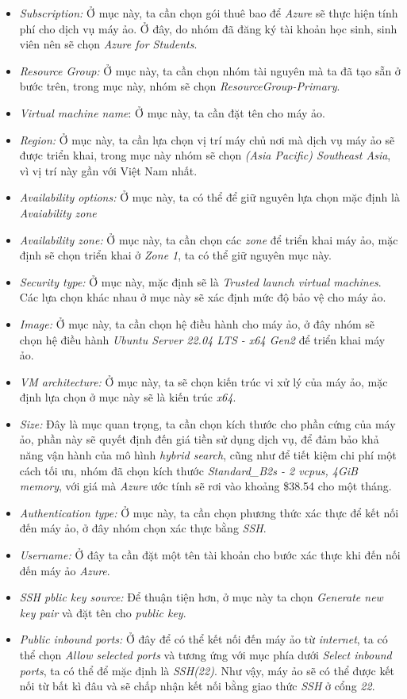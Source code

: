\begin{itemize}
    \item \textit{Subscription:} Ở mục này, ta cần chọn gói thuê bao để \textit{Azure} sẽ thực hiện tính phí cho dịch vụ máy ảo. Ở đây, do nhóm đã đăng ký tài khoản học sinh, sinh viên nên sẽ chọn \textit{Azure for Students}.
    \item \textit{Resource Group:} Ở mục này, ta cần chọn nhóm tài nguyên mà ta đã tạo sẵn ở bước trên, trong mục này, nhóm sẽ chọn \textit{ResourceGroup-Primary}.
    \item \textit{Virtual machine name}: Ở mục này, ta cần đặt tên cho máy ảo.
    \item \textit{Region:} Ở mục này, ta cần lựa chọn vị trí máy chủ nơi mà dịch vụ máy ảo sẽ được triển khai, trong mục này nhóm sẽ chọn \textit{(Asia Pacific) Southeast Asia}, vì vị trí này gần với Việt Nam nhất.
    \item \textit{Availability options:} Ở mục này, ta có thể để giữ nguyên lựa chọn mặc định là \textit{Avaiability zone}
    \item \textit{Availability zone:} Ở mục này, ta cần chọn các \textit{zone} để triển khai máy ảo, mặc định sẽ chọn triển khai ở \textit{Zone 1}, ta có thể giữ nguyên mục này.
    \item \textit{Security type:} Ở mục này, mặc định sẽ là \textit{Trusted launch virtual machines}. Các lựa chọn khác nhau ở mục này sẽ xác định mức độ bảo vệ cho máy ảo.
    \item \textit{Image:} Ở mục này, ta cần chọn hệ điều hành cho máy ảo, ở đây nhóm sẽ chọn hệ điều hành \textit{Ubuntu Server 22.04 LTS - x64 Gen2} để triển khai máy ảo.
    \item \textit{VM architecture:} Ở mục này, ta sẽ chọn kiến trúc vi xử lý của máy ảo, mặc định lựa chọn ở mục này sẽ là kiến trúc \textit{x64}.
    \item \textit{Size:} Đây là mục quan trọng, ta cần chọn kích thước cho phần cứng của máy ảo, phần này sẽ quyết định đến giá tiền sử dụng dịch vụ, để đảm bảo khả năng vận hành của mô hình \textit{hybrid search}, cũng như để tiết kiệm chi phí một cách tối ưu, nhóm đã chọn kích thước \textit{Standard\_B2s - 2 vcpus, 4GiB memory}, với giá mà \textit{Azure} ước tính sẽ rơi vào khoảng \$38.54 cho một tháng.
    \item \textit{Authentication type:} Ở mục này, ta cần chọn phương thức xác thực để kết nối đến máy ảo, ở đây nhóm chọn xác thực bằng \textit{SSH}.
    \item \textit{Username:} Ở đây ta cần đặt một tên tài khoản cho bước xác thực khi đến nối đến máy ảo \textit{Azure}.
    \item \textit{SSH pblic key source:} Để thuận tiện hơn, ở mục này ta chọn \textit{Generate new key pair} và đặt tên cho \textit{public key}.
    \item \textit{Public inbound ports:} Ở đây để có thể kết nối đến máy ảo từ \textit{internet}, ta có thể chọn \textit{Allow selected ports} và tương ứng với mục phía dưới \textit{Select inbound ports}, ta có thể để mặc định là \textit{SSH(22)}. Như vậy, máy ảo sẽ có thể được kết nối từ bất kì đâu và sẽ chấp nhận kết nối bằng giao thức \textit{SSH} ở cổng \textit{22}.
\end{itemize}
